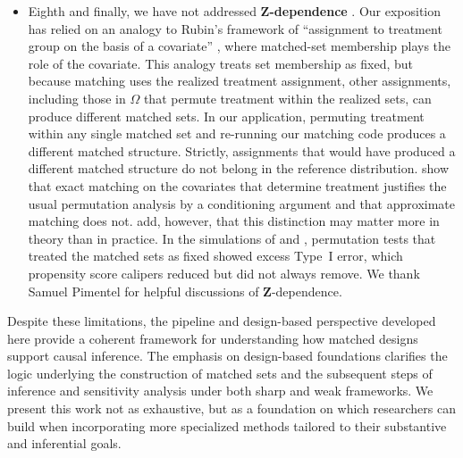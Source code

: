 \documentclass[twoside,11pt]{article}
\begin{document}
\begin{itemize}
  illustrative use is to support tests for hidden bias that
  inform sensitivity analyses by ruling out certain violations of as-if
  randomization \citep{rosenbaum2023a}.
\item
  Eighth and finally, we have not addressed \textbf{\(\bm{Z}\)-dependence}
  \citep{pashleyetal2021, pimentelhuang2024, pimentelyu2024}. Our
  exposition has relied on an analogy to Rubin's framework of
  ``assignment to treatment group on the basis of a covariate''
  \citep{rubin1977}, where matched-set membership plays the role of the
  covariate. This analogy treats set membership as fixed, but because
  matching uses the realized treatment assignment, other assignments,
  including those in \(\Omega\) that permute treatment within the realized
  sets, can produce different matched sets. In our application, permuting
  treatment within any single matched set and re-running our matching
  code produces a different matched structure. Strictly, assignments that
  would have produced a different matched structure do not belong in the
  reference distribution. \citet[Section~5]{pashleyetal2021} show that
  exact matching on the covariates that determine treatment justifies the
  usual permutation analysis by a conditioning argument and that
  approximate matching does not. \citet[p.~276]{pashleyetal2021} add,
  however, that this distinction may matter more in theory than in
  practice. In the simulations of
  \citet{pimentelhuang2024} and \citet{pimentelyu2024}, permutation tests that treated the matched sets as fixed showed excess Type~I error, which propensity score calipers reduced but did not always remove. We thank Samuel Pimentel for helpful discussions of
  \(\bm{Z}\)-dependence.
\end{itemize}

Despite these limitations, the pipeline and design-based perspective
developed here provide a coherent framework for understanding how
matched designs support causal inference. The emphasis on design-based
foundations clarifies the logic underlying the construction of matched
sets and the subsequent steps of inference and sensitivity analysis
under both sharp and weak frameworks. We present this work not as
exhaustive, but as a foundation on which researchers can build when
incorporating more specialized methods tailored to their substantive and
inferential goals.

\vskip 0.2in


\end{document}
